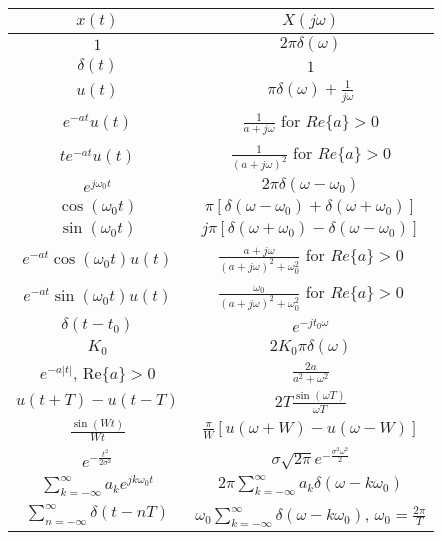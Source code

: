   \begin{center}
    \bgroup
    \def\arraystretch{2}
    \setlength\tabcolsep{1em}

    \begin{tabular}{|c|c|}
      \hline
      $x(t)$ & $X(j\omega)$\\
      \hline
      \hline
      $1$ & $2\pi\delta(\omega)$\\
      $\delta(t)$ & $1$\\
      $u(t)$ & $\pi\delta(\omega) + \frac{1}{j\omega}$\\
      $e^{-at}u(t)$ & $\frac{1}{a + j\omega}$ for $Re\{a\} > 0$\\
      $te^{-at}u(t)$ & $\frac{1}{\left(a + j\omega\right)^2}$ for $Re\{a\} > 0$\\
      $e^{j\omega_0 t}$ & $2\pi\delta(\omega-\omega_0)$\\
      $\cos(\omega_0 t)$ & $\pi\left[ \delta(\omega-\omega_0) + \delta(\omega+\omega_0)\right]$\\
      $\sin(\omega_0 t)$ & $j\pi\left[ \delta(\omega+\omega_0) - \delta(\omega-\omega_0)\right]$\\
      $e^{-at}\cos(\omega_0 t)u(t)$ & $\frac{a+j\omega}{(a+j\omega)^2 + \omega_0^2}$ for $Re\{a\} > 0$\\
      $e^{-at}\sin(\omega_0 t)u(t)$ & $\frac{\omega_0}{(a+j\omega)^2 + \omega_0^2}$ for $Re\{a\} > 0$\\
      $\delta(t - t_0)$  & $e^{-j t_0 \omega}$ \\ 
      $K_0$  & $2 K_0 \pi \delta(\omega)$ \\ 
      $e^{-a|t|}$, $\text{Re}\{a\} > 0$   & $\frac{2a}{a^2 + \omega^2}$ \\ 
      $u(t + T) - u(t - T)$  & $2T \frac{\sin{(\omega T)}}{\omega T}$ \\  
      $\frac{\sin{({W}t)}}{W t}$  & $\frac{\pi}{W} [u(\omega + W) - u(\omega - W)]$ \\ 
      $e^{-\frac{t^2}{2 \sigma^2}}$  & $\sigma \sqrt{2 \pi} e^{-\frac{\sigma^2 \omega^2}{2}} $ \\  
      $\sum\limits_{k=-\infty}^{\infty} a_k e^{j k \omega_0 t}$  & $2 \pi \sum\limits_{k=-\infty}^{\infty} a_k \delta{(\omega - k \omega_0)}$ \\ 
      $\sum\limits_{n=-\infty}^{\infty} \delta(t - nT)$  & $\omega_0 \sum\limits_{k=-\infty}^{\infty} \delta{(\omega - k \omega_0)}$, $\omega_0 = \frac{2 \pi}{T}$ \\  \hline
    \end{tabular}
    \egroup
  \end{center}

